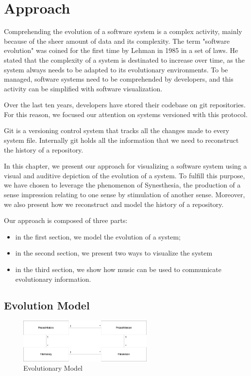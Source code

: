 
\chapter[Approach]{Approach}
\graphicspath{ {images/approach} }

Comprehending the evolution of a software system is a complex activity, mainly because of the sheer amount of data and its complexity. 
The term "software evolution" was coined for the first time by Lehman in 1985 in a set of laws. \cite{Lehman1985}
He stated that the complexity of a system is destinated to increase over time, as the system always needs to be adapted to its evolutionary environments. 
To be managed, software systems need to be comprehended by developers, and this activity can be simplified with software visualization. 

Over the last ten years, developers have stored their codebase on git repositories. 
For this reason, we focused our attention on systems versioned with this protocol.

Git is a versioning control system that tracks all the changes made to every system file. 
Internally git holds all the information that we need to reconstruct the history of a repository. 

In this chapter, we present our approach for visualizing a software system using a visual and auditive depiction of the evolution of a system. 
To fulfill this purpose, we have chosen to leverage the phenomenon of Synesthesia, the production of a sense impression relating to one sense by stimulation of another sense.
Moreover, we also present how we reconstruct and model the history of a repository. 

Our approach is composed of three parts: 
\begin{itemize}
    \item in the first section, we model the evolution of a system; 
    \item in the second section, we present two ways to visualize the system 
    \item in the third section, we show how music can be used to communicate evolutionary information. 
\end{itemize}


\section{Evolution Model}
\label{s:EvolutionModel}

\begin{figure}[H]
    \begin{center}
        \includegraphics[width=0.6\textwidth]{EvolutionaryModel.jpg}
    \end{center}
    \caption{Evolutionary Model}
    \label{fig:EvolutionaryModel}
\end{figure}

